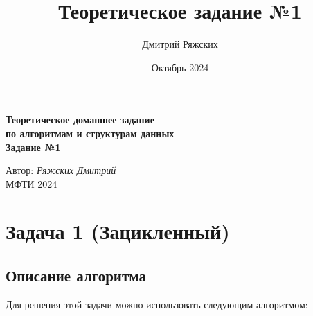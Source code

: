 \documentclass[a4paper,14pt]{article}
\title{Теоретическое задание №1}
\author{Дмитрий Ряжских}
\date{Октябрь 2024}
\begin{document}
\begin{titlepage}
	\clearpage\thispagestyle{empty}
	\centering
	\vspace{0.5ex}
	
	\textbf{Теоретическое домашнее задание \\ по алгоритмам и структурам данных \\ Задание №1}
	\vspace{20ex}
	\vspace{13ex}
	
	\vspace{1ex}
	Автор: \href{https://t.me/dimka_ryaz}{\textit{Ряжских Дмитрий}}\\

	\vfill
	   МФТИ 2024 
	\pagebreak
	
\end{titlepage}

\section{Задача 1 (Зацикленный)}
\subsection{Описание алгоритма}
Для решения этой задачи можно использовать следующим алгоритмом:
\end{document}
